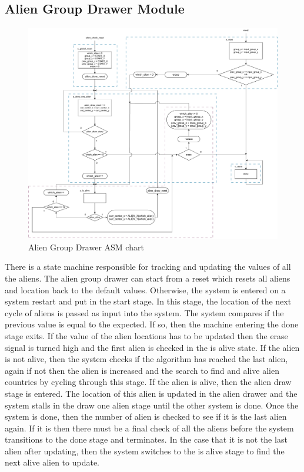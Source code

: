 \documentclass[11pt, titlepage]{article}
\begin{document}
        \subsection{Alien Group Drawer Module}
            \begin{figure}[H]
                \centering
                \includegraphics[scale = 0.45]{Images/Alien Group Drawer.pdf}
                \caption{Alien Group Drawer ASM chart}
            \end{figure}
            There is a state machine responsible for tracking and updating the values of all the aliens. The alien group drawer can start from a reset which resets all aliens and location back to the default values. Otherwise, the system is entered on a system restart and put in the start stage. In this stage, the location of the next cycle of aliens is passed as input into the system. The system compares if the previous value is equal to the expected. If so, then the machine entering the done stage exits. If the value of the alien locations has to be updated then the erase signal is turned high and the first alien is checked in the is alive state. If the alien is not alive, then the system checks if the algorithm has reached the last alien, again if not then the alien is increased and the search to find and alive alien countries by cycling through this stage. If the alien is alive, then the alien draw stage is entered. The location of this alien is updated in the alien drawer and the system stalls in the draw one alien stage until the other system is done. Once the system is done, then the number of alien is checked to see if it is the last alien again. If it is then there must be a final check of all the aliens before the system transitions to the done stage and terminates. In the case that it is not the last alien after updating, then the system switches to the is alive stage to find the next alive alien to update.
\end{document}
